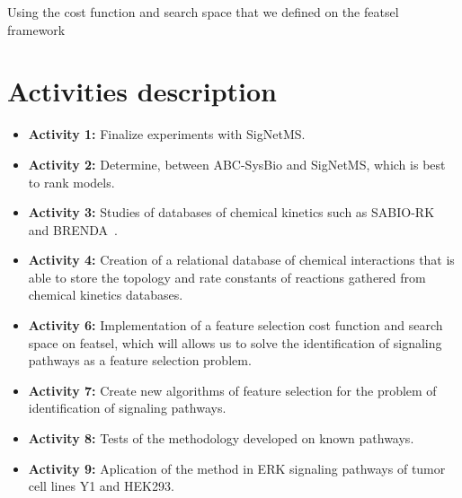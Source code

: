 Using the cost function and search space that we defined on the featsel
framework

\section{Activities description}
\begin{itemize}
    \item{\bf Activity 1:} Finalize experiments with SigNetMS.
    \item{\bf Activity 2:} Determine, between ABC-SysBio and SigNetMS,
        which is best to rank models.
    \item{\bf Activity 3:} Studies of databases of chemical kinetics 
        such as SABIO-RK~\cite{Wittig2011} and 
        BRENDA~\cite{Schomburg2004}.
    \item{\bf Activity 4:} Creation of a relational database of chemical 
        interactions that is able to store the topology and rate 
        constants of reactions gathered from chemical kinetics 
        databases.
    \item{\bf Activity 6:} Implementation of a feature selection cost
        function and search space on featsel, which will allows us to 
        solve the identification of signaling pathways as a feature 
        selection problem.
    \item{\bf Activity 7:} Create new algorithms of feature selection
        for the problem of identification of signaling pathways.
    \item{\bf Activity 8:} Tests of the methodology developed on known
        pathways.
    \item{\bf Activity 9:} Aplication of the method in ERK signaling 
        pathways of tumor cell lines Y1 and HEK293.
\end{itemize}


